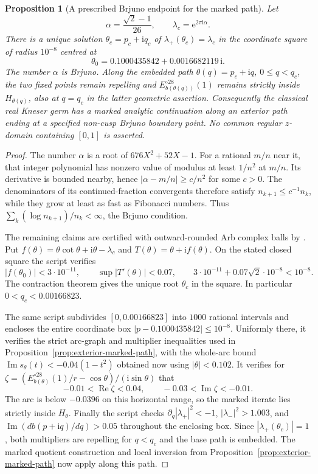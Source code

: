 \documentclass[11pt,a4paper]{article}
\newtheorem{proposition}[theorem]{Proposition}
\theoremstyle{definition}
\newcommand{\eee}{\mathrm{e}}
\newcommand{\ii}{\mathrm{i}}
\begin{document}
\begin{proposition}[A prescribed Brjuno endpoint for the marked path]
\label{prop:exterior-brjuno-path}
Let
\[
 \alpha=\frac{\sqrt2-1}{26},\qquad
 \lambda_c=\eee^{2\pi\ii\alpha}.
\]
There is a unique solution $\theta_c=p_c+\ii q_c$ of
$\lambda_+(\theta_c)=\lambda_c$ in the coordinate square of radius
$10^{-8}$ centred at
\[
 \theta_0=0.1000435842+0.0016682119\,\ii.
\]
The number $\alpha$ is Brjuno.  Along the embedded path
$\theta(q)=p_c+\ii q$, $0\le q<q_c$, the two fixed points remain
repelling and $E_{b(\theta(q))}^{\circ28}(1)$ remains strictly inside
$H_{\theta(q)}$, also at $q=q_c$ in the latter geometric assertion.
Consequently the classical real Kneser germ has a marked analytic
continuation along an exterior path ending at a specified non-cusp
Brjuno boundary point.  No common regular $z$-domain containing
$[0,1]$ is asserted.
\end{proposition}

\begin{proof}
The number $\alpha$ is a root of $676X^2+52X-1$.  For a rational
$m/n$ near it, that integer polynomial has nonzero value of modulus
at least $1/n^2$ at $m/n$.  Its derivative is bounded nearby, hence
$|\alpha-m/n|\ge c/n^2$ for some $c>0$.  The denominators of its
continued-fraction convergents therefore satisfy
$n_{k+1}\le c^{-1}n_k$, while they grow at least as fast as Fibonacci
numbers.  Thus $\sum_k(\log n_{k+1})/n_k<\infty$, the Brjuno condition.

The remaining claims are certified with outward-rounded Arb complex
balls by .  Put
$f(\theta)=\theta\cot\theta+\ii\theta-\lambda_c$ and
$T(\theta)=\theta+\ii f(\theta)$.  On the stated closed square the
script verifies
\[
 |f(\theta_0)|<3\cdot10^{-11},\qquad
 \sup|T'(\theta)|<0.07,\qquad
 3\cdot10^{-11}+0.07\sqrt2\cdot10^{-8}<10^{-8}.
\]
The contraction theorem gives the unique root $\theta_c$ in the
square.  In particular $0<q_c<0.00166823$.

The same script subdivides $[0,0.00166823]$ into $1000$ rational
intervals and encloses the entire coordinate box
$|p-0.1000435842|\le10^{-8}$.  Uniformly there, it verifies the
strict arc-graph and multiplier inequalities used in
Proposition~\ref{prop:exterior-marked-path}, with the whole-arc bound
$\operatorname{Im}s_\theta(t)<-0.04(1-t^2)$ obtained now using
$|\theta|<0.102$.  It verifies for
$\zeta=(E_{b(\theta)}^{\circ28}(1)/r-\cos\theta)/(\ii\sin\theta)$
that
\[
 -0.01<\operatorname{Re}\zeta<0.04,\qquad
 -0.03<\operatorname{Im}\zeta<-0.01.
\]
The arc is below $-0.0396$ on this horizontal range, so the marked
iterate lies strictly inside $H_\theta$.  Finally the script checks
$\partial_q|\lambda_+|^2<-1$, $|\lambda_-|^2>1.003$, and
$\operatorname{Im}(d b(p+\ii q)/dq)>0.05$ throughout the enclosing
box.  Since $|\lambda_+(\theta_c)|=1$, both multipliers are
repelling for $q<q_c$ and the base path is embedded.  The marked
quotient construction and local inversion from
Proposition~\ref{prop:exterior-marked-path} now apply along this path.
\end{proof}
\end{document}
